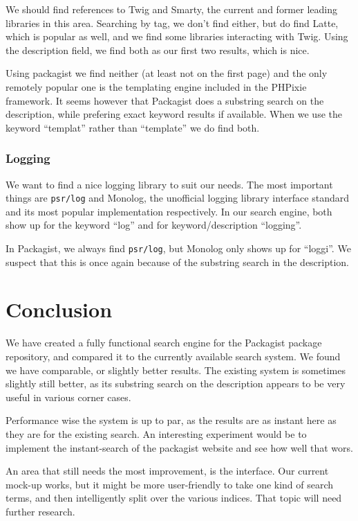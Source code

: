 \documentclass{article}
\begin{document}
We should find references to Twig and Smarty, the current and former leading libraries in this area. Searching by tag, we don't find either, but do find Latte, which is popular as well, and we find some libraries interacting with Twig. Using the description field, we find both as our first two results, which is nice.

Using packagist we find neither (at least not on the first page) and the only remotely popular one is the templating engine included in the PHPixie framework. It seems however that Packagist does a substring search on the description, while prefering exact keyword results if available. When we use the keyword ``templat'' rather than ``template'' we do find both.

\subsubsection{Logging}

We want to find a nice logging library to suit our needs. The most important things are \texttt{psr/log} and Monolog, the unofficial logging library interface standard and its most popular implementation respectively. In our search engine, both show up for the keyword ``log'' and for keyword/description ``logging''.

In Packagist, we always find \texttt{psr/log}, but Monolog only shows up for ``loggi''. We suspect that this is once again because of the substring search in the description.


\section{Conclusion}

We have created a fully functional search engine for the Packagist package repository, and compared it to the currently available search system. We found we have comparable, or slightly better results. The existing system is sometimes slightly still better, as its substring search on the description appears to be very useful in various corner cases.

Performance wise the system is up to par, as the results are as instant here as they are for the existing search. An interesting experiment would be to implement the instant-search of the packagist website and see how well that wors.


An area that still needs the most improvement, is the interface. Our current mock-up works, but it might be more user-friendly to take one kind of search terms, and then intelligently split over the various indices. That topic will need further research.

{}

\end{document}
